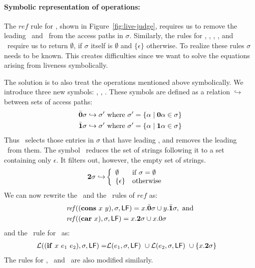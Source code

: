 \documentclass[9pt,preprint,letter,nonatbib]{sigplanconf}
\begin{document}
\paragraph{Symbolic representation of operations:}
The   $\mathit{ref}$   rule   for   \CONS,   shown   in
Figure~\ref{fig:live-judge}, requires us  to remove the
leading  \acar\ and  \acdr\  from the  access paths  in
$\sigma$.  Similarly, the rules  for \CAR, \CDR, \PRIM,
\NULLQ, and \SIF\ require  us to return $\emptyset$, if
$\sigma$      itself       is      $\emptyset$      and
$\lbrace\epsilon\rbrace$  otherwise.  To  realize these
rules  $\sigma$   needs  to  be  known.   This  creates
difficulties  since  we  want to  solve  the  equations
arising from liveness symbolically.

The solution is to  also treat the operations mentioned
above  symbolically.  We  introduce three  new symbols:
\bcar, \bcdr,  \clazy.  These symbols are  defined as a
relation  $\hookrightarrow$  between   sets  of  access
paths:
\begin{align*}
  &\bar{\mathbf{0}}\sigma \hookrightarrow \sigma' \mbox{ where } \sigma' = \{\alpha \mid \mathbf{0}\alpha \in \sigma\}\\
  &\bar{\mathbf{1}}\sigma \hookrightarrow \sigma' \mbox{ where } \sigma' = \{\alpha \mid \mathbf{1}\alpha \in \sigma\}
\end{align*}
Thus \bcar\ selects those entries in $\sigma$ that have leading \acar, and removes the leading \acar\ from them.
The symbol \clazy\ reduces the set of strings following it to a set containing only $\epsilon$. It filters out, however, the empty set of strings.
\begin{align*}
  {\mathbf{2}}\sigma \hookrightarrow & \left\{ 
  \begin{array}{ll}
    \emptyset&\mbox{if}~\sigma = \emptyset\\
    \{\epsilon\} & \mbox{otherwise}
  \end{array}\right.
\end{align*}
We can  now rewrite the \CONS\  and the \CAR\  rules of $\mathit{ref}$
as:
\begin{align*}
&\mathit{ref\/}((\mbox{$\mathbf{cons}$}~x~y),\sigma,\mathsf{LF})
= x.\bar{\mathbf{0}}\sigma \cup y.\bar{\mathbf{1}}\sigma  \label{eqn:mod-cons},~
\mbox{and} \\
&\mathit{ref\/}((\mbox{$\mathbf{car}$}~x),\sigma,\mathsf{LF})
          =   x.{\mathbf{2}}\sigma \cup x.0\sigma
\end{align*}
and the \Lfunonly\ rule
for \SIF\ as:
\begin{align*}
\mathcal{L}((\mbox{$\mathbf{ if}$}~x~e_1~e_2),\sigma,\mathsf{LF}) =
                    &\mathcal{L}(e_1,\sigma,\mathsf{LF})~\cup
        \mathcal{L}(e_2,\sigma,\mathsf{LF})~\cup
          \{x.{\mathbf{2}} \sigma\}
\end{align*}
The rules for  \CDR, \PRIM\ and \NULLQ\ are also
modified similarly.
\end{document}
